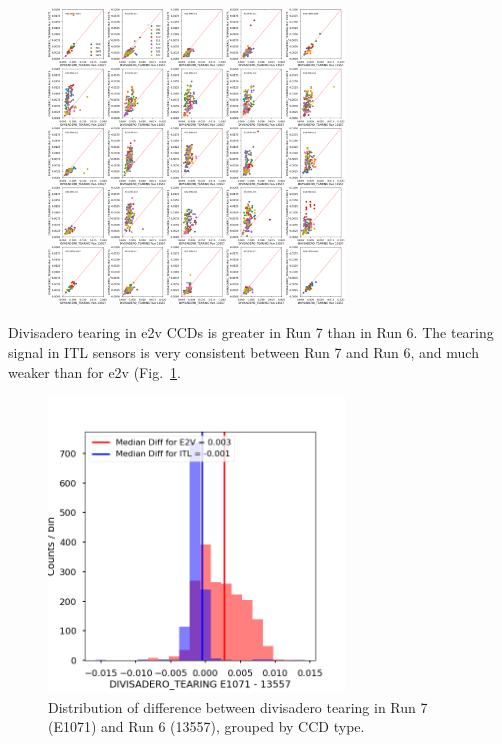 \begin{figure}[H]
\begin{centering}
\includegraphics[width=0.7\textwidth]{figures/baselineCharacterization/13557_E1071_DIVISADERO_TEARING.png}
\end{centering}
\end{figure}

Divisadero tearing in e2v CCDs is greater in Run 7 than in Run 6. The tearing signal in ITL
sensors is very consistent between Run 7 and Run 6, and much weaker than for e2v (Fig.~\ref{fig:divisadero}.

\begin{figure}[H]
\begin{centering}
\includegraphics[width=0.7\textwidth]{figures/baselineCharacterization/DIVISADERO_TEARING_13557_E1071_diff.png}
\caption{Distribution of difference between divisadero tearing in Run 7 (E1071) and Run 6 (13557), grouped by CCD type.}
\label{fig:divisadero}
\end{centering}
\end{figure}

